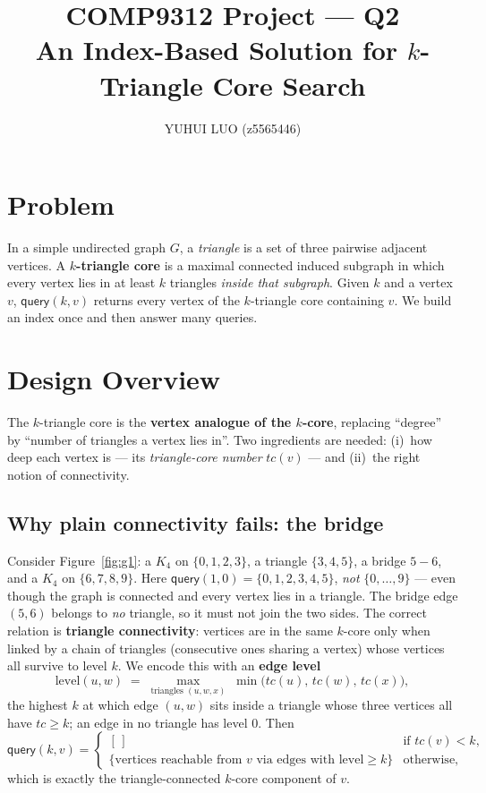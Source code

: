 \documentclass[11pt]{article}
\title{\vspace{-1.4em}\textbf{COMP9312 Project --- Q2}\\[0.2em]
\large An Index-Based Solution for $k$-Triangle Core Search}
\author{YUHUI LUO \quad (z5565446)}
\date{}
\begin{document}
\maketitle
\vspace{-2.2em}

\section{Problem}
In a simple undirected graph $G$, a \emph{triangle} is a set of three pairwise
adjacent vertices. A \textbf{$k$-triangle core} is a maximal connected induced
subgraph in which every vertex lies in at least $k$ triangles \emph{inside that
subgraph}. Given $k$ and a vertex $v$, $\textsf{query}(k,v)$ returns every vertex
of the $k$-triangle core containing $v$. We build an index once and then answer
many queries.

\section{Design Overview}
The $k$-triangle core is the \textbf{vertex analogue of the $k$-core}, replacing
``degree'' by ``number of triangles a vertex lies in''. Two ingredients are
needed: (i)~how deep each vertex is --- its \emph{triangle-core number}
$tc(v)$ --- and (ii)~the right notion of connectivity.

\subsection{Why plain connectivity fails: the bridge}
Consider Figure~\ref{fig:g1}: a $K_4$ on $\{0,1,2,3\}$, a triangle $\{3,4,5\}$, a
bridge $5\!-\!6$, and a $K_4$ on $\{6,7,8,9\}$. Here
$\textsf{query}(1,0)=\{0,1,2,3,4,5\}$, \emph{not} $\{0,\dots,9\}$ --- even though
the graph is connected and every vertex lies in a triangle. The bridge edge
$(5,6)$ belongs to \emph{no} triangle, so it must not join the two sides. The
correct relation is \textbf{triangle connectivity}: vertices are in the same
$k$-core only when linked by a chain of triangles (consecutive ones sharing a
vertex) whose vertices all survive to level $k$. We encode this with an
\textbf{edge level}
\[
  \mathrm{level}(u,w)\;=\;\max_{\text{triangles }(u,w,x)}\;
  \min\!\big(tc(u),\,tc(w),\,tc(x)\big),
\]
the highest $k$ at which edge $(u,w)$ sits inside a triangle whose three vertices
all have $tc\ge k$; an edge in no triangle has level $0$. Then
\[
  \textsf{query}(k,v)=
  \begin{cases}
    [\,] & \text{if } tc(v)<k,\\[2pt]
    \{\text{vertices reachable from }v\text{ via edges with }\mathrm{level}\ge k\}
      & \text{otherwise,}
  \end{cases}
\]
which is exactly the triangle-connected $k$-core component of $v$.
\end{document}
